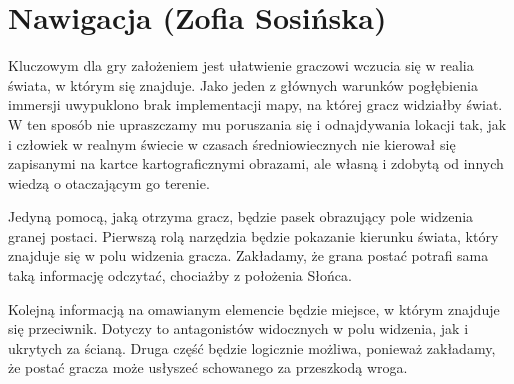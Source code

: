 \section{Nawigacja (Zofia Sosińska)}\label{chap:naw}

Kluczowym dla gry założeniem jest ułatwienie graczowi wczucia się w realia świata, w którym się znajduje. 
Jako jeden z głównych warunków pogłębienia immersji uwypuklono brak implementacji mapy, na której gracz widziałby świat. 
W ten sposób nie upraszczamy mu poruszania się i odnajdywania lokacji tak,
jak i człowiek w realnym świecie w czasach średniowiecznych nie kierował się zapisanymi na kartce kartograficznymi obrazami, 
ale własną i zdobytą od innych wiedzą o otaczającym go terenie. 

Jedyną pomocą, jaką otrzyma gracz, będzie pasek obrazujący pole widzenia granej postaci.
Pierwszą rolą narzędzia będzie pokazanie kierunku świata, który znajduje się w polu widzenia gracza.
Zakładamy, że grana postać potrafi sama taką informację odczytać, chociażby z położenia Słońca.

Kolejną informacją na omawianym elemencie będzie miejsce, w którym znajduje się przeciwnik. 
Dotyczy to antagonistów widocznych w polu widzenia, jak i ukrytych za ścianą. 
Druga część będzie logicznie możliwa, ponieważ zakładamy, że postać gracza może usłyszeć 
schowanego za przeszkodą wroga.


